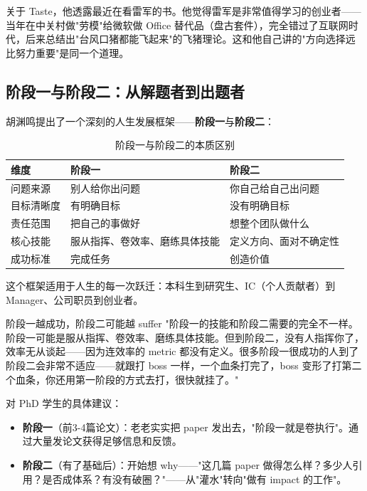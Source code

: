 \documentclass[a4paper]{article}
\begin{document}
关于 Taste，他透露最近在看雷军的书。他觉得雷军是非常值得学习的创业者——当年在中关村做"劳模"给微软做 Office 替代品（盘古套件），完全错过了互联网时代，后来总结出"台风口猪都能飞起来"的飞猪理论。这和他自己讲的"方向选择远比努力重要"是同一个道理。

\subsection{阶段一与阶段二：从解题者到出题者}

胡渊鸣提出了一个深刻的人生发展框架——\textbf{阶段一}与\textbf{阶段二}：

\begin{table}[H]
\centering
\caption{阶段一与阶段二的本质区别}
\begin{tabular}{lll}
\toprule
\textbf{维度} & \textbf{阶段一} & \textbf{阶段二} \\
\midrule
问题来源 & 别人给你出问题 & 你自己给自己出问题 \\
目标清晰度 & 有明确目标 & 没有明确目标 \\
责任范围 & 把自己的事做好 & 想整个团队做什么 \\
核心技能 & 服从指挥、卷效率、磨练具体技能 & 定义方向、面对不确定性 \\
成功标准 & 完成任务 & 创造价值 \\
\bottomrule
\end{tabular}
\end{table}

这个框架适用于人生的每一次跃迁：本科生到研究生、IC（个人贡献者）到 Manager、公司职员到创业者。

\begin{warningbox}{阶段一越成功，阶段二可能越 suffer}
"阶段一的技能和阶段二需要的完全不一样。阶段一可能是服从指挥、卷效率、磨练具体技能。但到阶段二，没有人指挥你了，效率无从谈起——因为连效率的 metric 都没有定义。很多阶段一很成功的人到了阶段二会非常不适应——就跟打 boss 一样，一个血条打完了，boss 变形了打第二个血条，你还用第一阶段的方式去打，很快就挂了。"
\end{warningbox}

对 PhD 学生的具体建议：
\begin{itemize}
\item \textbf{阶段一}（前3-4篇论文）：老老实实把 paper 发出去，"阶段一就是卷执行"。通过大量发论文获得足够信息和反馈。
\item \textbf{阶段二}（有了基础后）：开始想 why——"这几篇 paper 做得怎么样？多少人引用？是否成体系？有没有破圈？"——从"灌水"转向"做有 impact 的工作"。
\end{itemize}
\end{document}
